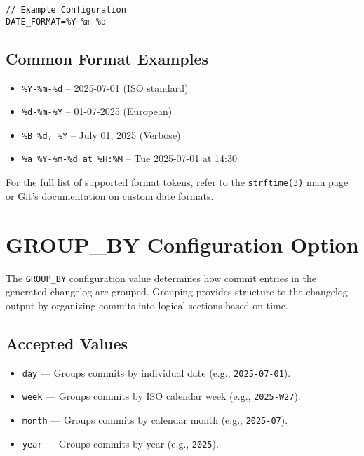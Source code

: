 \begin{lstlisting}[style=cppstyle]
// Example Configuration
DATE_FORMAT=%Y-%m-%d
\end{lstlisting}

\subsection*{Common Format Examples}
\begin{itemize}
	\item \texttt{\%Y-\%m-\%d} – 2025-07-01 (ISO standard)
	\item \texttt{\%d-\%m-\%Y} – 01-07-2025 (European)
	\item \texttt{\%B \%d, \%Y} – July 01, 2025 (Verbose)
	\item \texttt{\%a \%Y-\%m-\%d at \%H:\%M} – Tue 2025-07-01 at 14:30
\end{itemize}

For the full list of supported format tokens, refer to the \texttt{strftime(3)}\cite{strftime(3)} man page or Git's documentation on custom date formats.










\section{GROUP\_BY Configuration Option}
\label{sec:groupby}

The \texttt{GROUP\_BY} configuration value determines how commit entries in the generated changelog are grouped. Grouping provides structure to the changelog output by organizing commits into logical sections based on time.

\subsection*{Accepted Values}
\begin{itemize}
	\item \texttt{day} --- Groups commits by individual date (e.g., \texttt{2025-07-01}).
	\item \texttt{week} --- Groups commits by ISO calendar week (e.g., \texttt{2025-W27}).
	\item \texttt{month} --- Groups commits by calendar month (e.g., \texttt{2025-07}).
	\item \texttt{year} --- Groups commits by year (e.g., \texttt{2025}).
\end{itemize}

